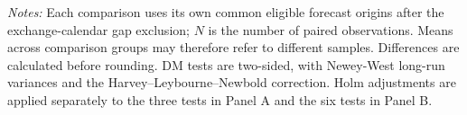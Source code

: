 \begin{table}[htbp]
\vspace{0.35em}
\begin{minipage}{\textwidth}
\scriptsize
\textit{Notes:} Each comparison uses its own common eligible forecast
origins after the exchange-calendar gap exclusion; $N$ is the number
of paired observations. Means across comparison groups may therefore
refer to different samples. Differences are calculated before rounding.
DM tests are two-sided, with Newey-West long-run variances and the
Harvey--Leybourne--Newbold correction. Holm adjustments are applied
separately to the three tests in Panel A and the six tests in Panel B.
\end{minipage}
\end{table}
